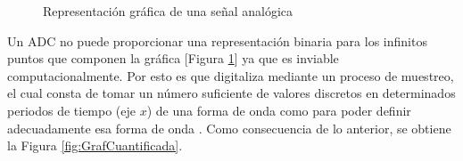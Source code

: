 \documentclass[12pt, a4paper]{article}
\begin{document}
        \begin{figure}[H]
        \centering
        \caption{Representación gráfica de una señal analógica}
        \label{fig:GrafAnalogica}
    \end{figure}

    Un ADC no puede proporcionar una representación binaria para los infinitos puntos que componen la gráfica [Figura \ref{fig:GrafAnalogica}] ya que es inviable computacionalmente. Por esto es que digitaliza mediante un proceso de muestreo, el cual consta de tomar un número suficiente de valores discretos en determinados periodos de tiempo (eje $x$) de una forma de onda como para poder definir adecuadamente esa forma de onda \parencite{floyd2006fundamentos}. Como consecuencia de lo anterior, se obtiene la Figura \ref{fig:GrafCuantificada}.
\end{document}

